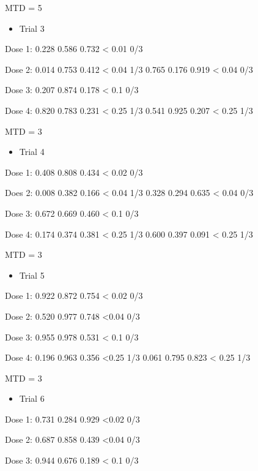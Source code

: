 \documentclass[]{article}
\providecommand{\tightlist}{%
  \setlength{\itemsep}{0pt}\setlength{\parskip}{0pt}}
\begin{document}
MTD = 5

\begin{itemize}
\tightlist
\item
  Trial 3
\end{itemize}

Dose 1: 0.228 0.586 0.732 \textless{} 0.01 0/3

Dose 2: 0.014 0.753 0.412 \textless{} 0.04 1/3 \textbar{} 0.765 0.176
0.919 \textless{} 0.04 0/3

Dose 3: 0.207 0.874 0.178 \textless{} 0.1 0/3

Dose 4: 0.820 0.783 0.231 \textless{} 0.25 1/3 \textbar{} 0.541 0.925
0.207 \textless{} 0.25 1/3

MTD = 3

\begin{itemize}
\tightlist
\item
  Trial 4
\end{itemize}

Dose 1: 0.408 0.808 0.434 \textless{} 0.02 0/3

Does 2: 0.008 0.382 0.166 \textless{} 0.04 1/3 \textbar{} 0.328 0.294
0.635 \textless{} 0.04 0/3

Dose 3: 0.672 0.669 0.460 \textless{} 0.1 0/3

Dose 4: 0.174 0.374 0.381 \textless{} 0.25 1/3 \textbar{} 0.600 0.397
0.091 \textless{} 0.25 1/3

MTD = 3

\begin{itemize}
\tightlist
\item
  Trial 5
\end{itemize}

Dose 1: 0.922 0.872 0.754 \textless{} 0.02 0/3

Dose 2: 0.520 0.977 0.748 \textless0.04 0/3

Dose 3: 0.955 0.978 0.531 \textless{} 0.1 0/3

Dose 4: 0.196 0.963 0.356 \textless0.25 1/3 \textbar{} 0.061 0.795 0.823
\textless{} 0.25 1/3

MTD = 3

\begin{itemize}
\tightlist
\item
  Trial 6
\end{itemize}

Dose 1: 0.731 0.284 0.929 \textless0.02 0/3

Dose 2: 0.687 0.858 0.439 \textless0.04 0/3

Dose 3: 0.944 0.676 0.189 \textless{} 0.1 0/3
\end{document}
